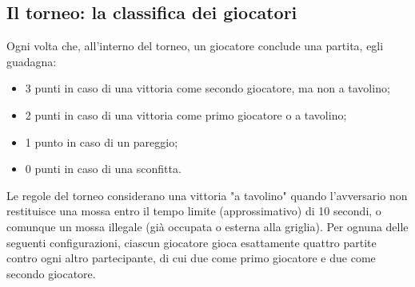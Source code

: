 \documentclass{article}
\begin{document}
\subsection{Il torneo: la classifica dei giocatori}

Ogni volta che, all'interno del torneo, un giocatore conclude una partita, egli
guadagna: 
\begin{itemize}
  \item 3 punti in caso di una vittoria come secondo giocatore, ma non a
    tavolino;
  \item 2 punti in caso di una vittoria come primo giocatore o a tavolino;
  \item 1 punto in caso di un pareggio;
  \item 0 punti in caso di una sconfitta.
\end{itemize}

\noindent
Le regole del torneo considerano una vittoria "a tavolino" quando l'avversario
non restituisce una mossa entro il tempo limite (approssimativo) di 10 secondi,
o comunque un mossa illegale (già occupata o esterna alla griglia).
Per ognuna delle seguenti configurazioni, ciascun giocatore gioca
esattamente quattro partite contro ogni altro partecipante, di cui due come
primo giocatore e due come secondo giocatore.
\end{document}
